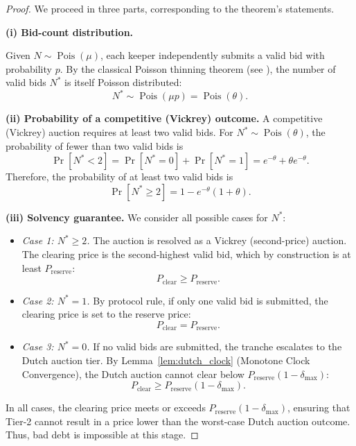 \documentclass[11pt]{article}
\begin{document}
\begin{proof}
We proceed in three parts, corresponding to the theorem's statements.

\textbf{(i) Bid-count distribution.}  

Given $N \sim \operatorname{Pois}(\mu)$, each keeper independently submits a valid bid with probability $p$. By the classical Poisson thinning theorem (see \textcite[Thm.~5, \S~II.6]{feller1968}), the number of valid bids $N^*$ is itself Poisson distributed:
\[
    N^* \sim \operatorname{Pois}(\mu p) = \operatorname{Pois}(\theta).
\]

\textbf{(ii) Probability of a competitive (Vickrey) outcome.}  
A competitive (Vickrey) auction requires at least two valid bids. For $N^* \sim \operatorname{Pois}(\theta)$, the probability of fewer than two valid bids is
\[
    \Pr[N^* < 2] = \Pr[N^* = 0] + \Pr[N^* = 1] = e^{-\theta} + \theta e^{-\theta}.
\]
Therefore, the probability of at least two valid bids is
\[
    \Pr[N^* \geq 2] = 1 - e^{-\theta}(1 + \theta).
\]

\textbf{(iii) Solvency guarantee.}  
We consider all possible cases for $N^*$:
\begin{itemize}
    \item \emph{Case 1: $N^* \geq 2$.}  
        The auction is resolved as a Vickrey (second-price) auction. The clearing price is the second-highest valid bid, which by construction is at least $P_{\mathrm{reserve}}$:
        \[
            P_{\mathrm{clear}} \geq P_{\mathrm{reserve}}.
        \]
    \item \emph{Case 2: $N^* = 1$.}  
        By protocol rule, if only one valid bid is submitted, the clearing price is set to the reserve price:
        \[
            P_{\mathrm{clear}} = P_{\mathrm{reserve}}.
        \]
    \item \emph{Case 3: $N^* = 0$.}  
        If no valid bids are submitted, the tranche escalates to the Dutch auction tier. By Lemma~\ref{lem:dutch_clock} (Monotone Clock Convergence), the Dutch auction cannot clear below $P_{\mathrm{reserve}}(1-\delta_{\max})$:
        \[
            P_{\mathrm{clear}} \geq P_{\mathrm{reserve}}(1 - \delta_{\max}).
        \]
\end{itemize}
In all cases, the clearing price meets or exceeds $P_{\mathrm{reserve}}(1 - \delta_{\max})$, ensuring that Tier-2 cannot result in a price lower than the worst-case Dutch auction outcome. Thus, bad debt is impossible at this stage.
\end{proof}
\end{document}
